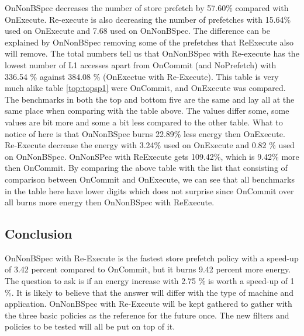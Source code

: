 OnNonBSpec decreases the number of store prefetch by 57.60\% compared with OnExecute. Re-execute is also decreasing the number of prefetches with 15.64\% used on OnExecute and 7.68 used on OnNonBSpec. The difference can be explained by OnNonBSpec removing some of the prefetches that ReExecute also will remove. The total numbers tell us that OnNonBSpec with Re-execute has the lowest number of L1 accesses apart from OnCommit (and NoPrefetch) with 336.54 \% against 384.08 \% (OnExectue with Re-Execute).  
This table is very much alike table \ref{top:topsp1} were OnCommit, and OnExecute was compared. The benchmarks in both the top and bottom five are the same and lay all at the same place when comparing with the table above. The values differ some, some values are bit more and some a bit less compared to the other table.
\resEnergy 
{}
What to notice of here is that OnNonBSpec burns 22.89\% less energy then OnExecute. Re-Execute decrease the energy with 3.24\% used on OnExecute and 0.82 \% used on OnNonBSpec. OnNonSPec with ReExecute gets 109.42\%, which is 9.42\% more then OnCommit.  
By comparing the above table with the list that consisting of comparison between OnCommit and OnExecute, we can see that all benchmarks in the table here have lower digits which does not surprise since OnCommit over all burns more energy then OnNonBSpec with ReExecute.

\subsection{Conclusion}
OnNonBSpec with Re-Execute is the fastest store prefetch policy with a speed-up of 3.42 percent compared to OnCommit, but it burns 9.42 percent more energy. The question to ask is if an energy increase with 2.75 \% is worth a speed-up of 1 \%. It is likely to believe that the answer will differ with the type of machine and application. OnNonBSpec with Re-Execute will be kept gathered to gather with the three basic policies as the reference for the future once. The new filters and policies to be tested will all be put on top of it.

